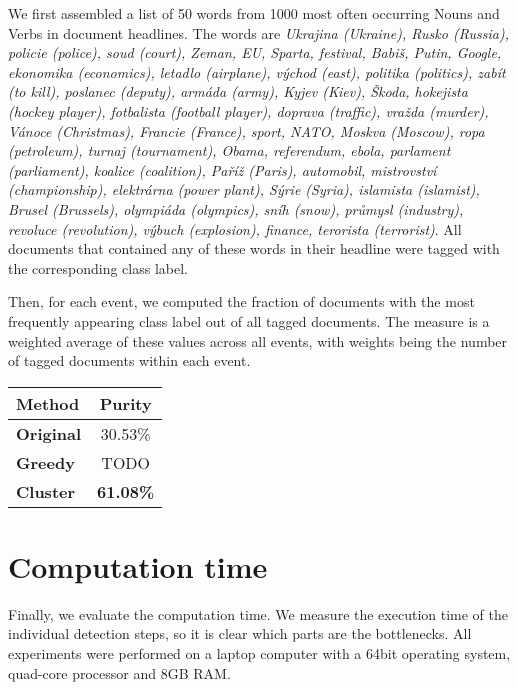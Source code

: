 We first assembled a list of 50 words from 1000 most often occurring Nouns and Verbs in document headlines. The words are \textit{Ukrajina (Ukraine), Rusko (Russia), policie (police), soud (court), Zeman, EU, Sparta, festival, Babiš, Putin, Google, ekonomika (economics), letadlo (airplane), východ (east), politika (politics), zabít (to kill), poslanec (deputy), armáda (army), Kyjev (Kiev), Škoda, hokejista (hockey player), fotbalista (football player), doprava (traffic), vražda (murder), Vánoce (Christmas), Francie (France), sport, NATO, Moskva (Moscow), ropa (petroleum), turnaj (tournament), Obama, referendum, ebola, parlament (parliament), koalice (coalition), Paříž (Paris), automobil, mistrovství (championship), elektrárna (power plant), Sýrie (Syria), islamista (islamist), Brusel (Brussels), olympiáda (olympics), sníh (snow), průmysl (industry), revoluce (revolution), výbuch (explosion), finance, terorista (terrorist)}. All documents that contained any of these words in their headline were tagged with the corresponding class label.

Then, for each event, we computed the fraction of documents with the most frequently appearing class label out of all tagged documents. The measure is a weighted average of these values across all events, with weights being the number of tagged documents within each event.

\hspace{\fill}

\begin{minipage}{\linewidth}
\centering
\begin{tabular}{ l c }\toprule[1.5pt]
\bf Method 	 & \bf Purity \\ \midrule
\bf Original &  30.53\% \\
\bf Greedy   &  {\color{red} TODO} \\
\bf Cluster &  \bf 61.08\% \\ \bottomrule[1.25pt]
\end {tabular}\par
{} \label{tab:title} 
\end{minipage}

\hspace{\fill}

\section{Computation time}

Finally, we evaluate the computation time. We measure the execution time of the individual detection steps, so it is clear which parts are the bottlenecks. All experiments were performed on a laptop computer with a 64bit operating system, quad-core processor and 8GB RAM.

